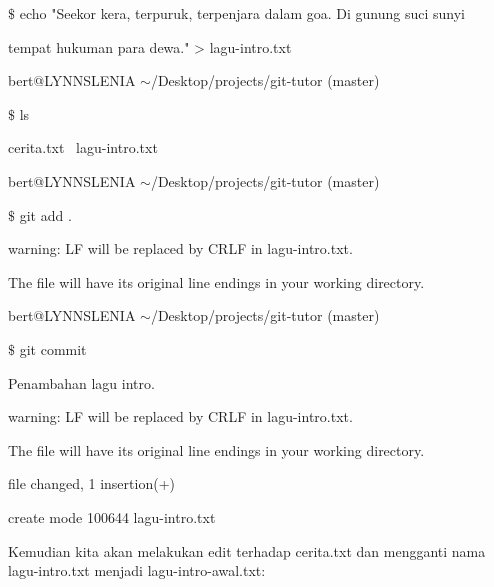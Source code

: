 \noindent 
{\fontsize{10pt}{10pt}\selectfont  $  \$  $ echo "Seekor kera, terpuruk, terpenjara dalam goa. Di gunung suci sunyi} \par
\noindent 
{\fontsize{10pt}{10pt}\selectfont tempat hukuman para dewa." > lagu-intro.txt} \par
\noindent 
\vspace{10pt}
\noindent 
{\fontsize{10pt}{10pt}\selectfont bert@LYNNSLENIA  $  \sim  $/Desktop/projects/git-tutor (master)} \par
\noindent 
{\fontsize{10pt}{10pt}\selectfont  $  \$  $ ls} \par
\noindent 
{\fontsize{10pt}{10pt}\selectfont cerita.txt~ lagu-intro.txt} \par
\noindent 
\vspace{10pt}
\noindent 
{\fontsize{10pt}{10pt}\selectfont bert@LYNNSLENIA  $  \sim  $/Desktop/projects/git-tutor (master)} \par
\noindent 
{\fontsize{10pt}{10pt}\selectfont  $  \$  $ git add .} \par
\noindent 
{\fontsize{10pt}{10pt}\selectfont warning: LF will be replaced by CRLF in lagu-intro.txt.} \par
\noindent 
{\fontsize{10pt}{10pt}\selectfont The file will have its original line endings in your working directory.} \par
\noindent 
\vspace{10pt}
\noindent 
{\fontsize{10pt}{10pt}\selectfont bert@LYNNSLENIA  $  \sim  $/Desktop/projects/git-tutor (master)} \par
\noindent 
{\fontsize{10pt}{10pt}\selectfont  $  \$  $ git commit} \par
\noindent 
{\fontsize{10pt}{10pt}\selectfont [master 03d0628] Penambahan lagu intro.} \par
\noindent 
{\fontsize{10pt}{10pt}\selectfont warning: LF will be replaced by CRLF in lagu-intro.txt.} \par
\noindent 
{\fontsize{10pt}{10pt}\selectfont The file will have its original line endings in your working directory.} \par
\noindent 
{\fontsize{10pt}{10pt} file changed, 1 insertion(+)} \par
\noindent 
{\fontsize{10pt}{10pt}\selectfont  create mode 100644 lagu-intro.txt} \par
\vspace{12pt}
Kemudian kita akan melakukan edit terhadap cerita.txt dan mengganti nama lagu-intro.txt menjadi lagu-intro-awal.txt: \par
